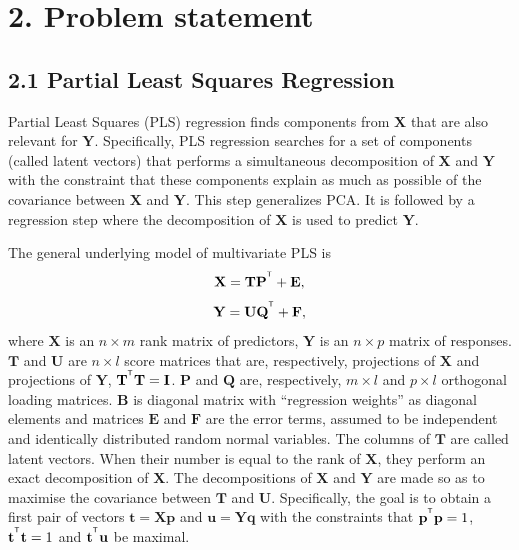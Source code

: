 \documentclass[12pt,twoside]{article}
\newcommand{\bY}{\mathbf{Y}}
\newcommand{\bX}{\mathbf{X}}
\newcommand{\bu}{\mathbf{u}}
\newcommand{\bt}{\mathbf{t}}
\newcommand{\bp}{\mathbf{p}}
\newcommand{\bq}{\mathbf{q}}
\newcommand{\bP}{\mathbf{P}}
\newcommand{\bT}{\mathbf{T}}
\newcommand{\bQ}{\mathbf{Q}}
\newcommand{\bE}{\mathbf{E}}
\newcommand{\bF}{\mathbf{F}}
\newcommand{\bU}{\mathbf{U}}
\newcommand{\bI}{\mathbf{I}}
\newcommand{\bB}{\mathbf{B}}
\begin{document}
\section{2. Problem statement}

\subsection{2.1 Partial Least Squares Regression}
	Partial Least Squares (PLS) regression finds components from $\bX$ that are also relevant for $\bY$. Specifically, PLS regression searches for a set of components (called latent vectors) that performs a simultaneous decomposition of $\bX$ and $\bY$ with the constraint that these components explain as much as possible of the covariance between $\bX$ and $\bY$. This step generalizes PCA. It is followed by a regression step where the decomposition of $\bX$ is used to predict $\bY$.	

	The general underlying model of multivariate PLS is
	\[
		\bX = \bT \bP^{\T} + \bE,
	\]
	\[
		\bY = \bU \bQ^{\T} + \bF,
	\]
	where $\bX$ is an $n\times m$ rank matrix of predictors, $\bY$ is an $n\times p$ matrix of responses. $\bT$ and $\bU$ are $n\times l$ score matrices that are, respectively, projections of $\bX$ and projections of $\bY$, $\bT^{\T} \bT = \bI$. $\bP$ and $\bQ$ are, respectively, $m \times l$ and $p \times l$ orthogonal loading matrices. $\bB$ is diagonal matrix with ``regression weights'' as diagonal elements and matrices $\bE$ and $\bF$ are the error terms, assumed to be independent and identically distributed random normal variables. 
	The columns of $\bT$ are called latent vectors. When their number is equal to the rank  of $\bX$, they perform an exact decomposition of $\bX$. The decompositions of $\bX$ and $\bY$ are made so as to maximise the covariance between $\bT$ and $\bU$. Specifically, the goal is to obtain a first pair of vectors $\bt = \bX \bp$ and $\bu = \bY \bq$ with the constraints that $\bp^{\T}\bp = 1$, $\bt^{\T}\bt = 1$ and $\bt^{\T}\bu$ be maximal.
\end{document}
